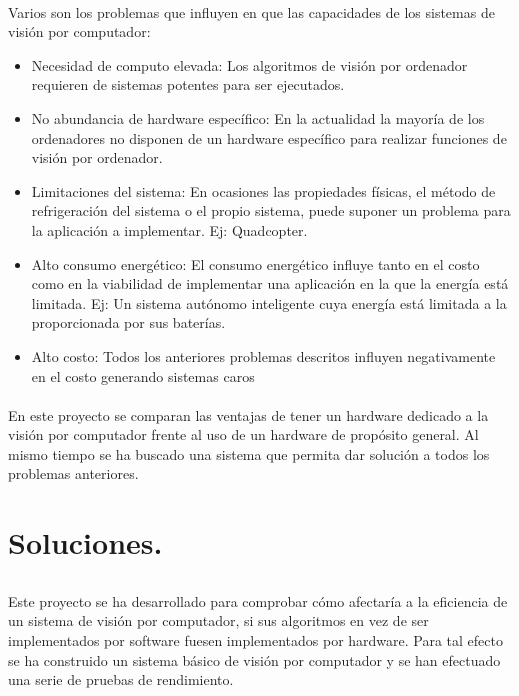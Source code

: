 \documentclass[a4paper,12pt,titlepage,final]{book}
\begin{document}
\paragraph{}
Varios son los problemas que influyen en que las capacidades de los sistemas de visión por computador:
\begin{itemize}
  \item Necesidad de computo elevada: Los algoritmos de visión por ordenador requieren de sistemas potentes para ser ejecutados.
  \item No abundancia de hardware específico: En la actualidad la mayoría de los ordenadores no disponen de un hardware específico para realizar funciones de visión por ordenador.
  \item Limitaciones del sistema: En ocasiones las propiedades físicas, el método de refrigeración del sistema o el propio sistema, puede suponer un problema para la aplicación a implementar. Ej: Quadcopter.
  \item Alto consumo energético: El consumo energético influye tanto en el costo como en la viabilidad de implementar una aplicación en la que la energía está limitada. Ej: Un sistema autónomo inteligente cuya energía está limitada a la proporcionada por sus baterías.
  \item Alto costo: Todos los anteriores problemas descritos influyen negativamente en el costo generando sistemas caros
\end{itemize}

\paragraph{}
En este proyecto se comparan las ventajas de tener un hardware dedicado a la
visión por computador frente al uso de un hardware de propósito general. Al
mismo tiempo se ha buscado una sistema que permita dar solución a todos los
problemas anteriores.

\section{Soluciones.}
\subsection*{}
\subsubsection*{}

\paragraph{}
Este proyecto se ha desarrollado para comprobar cómo afectaría a la eficiencia de un sistema de visión por computador, si sus algoritmos en vez de ser implementados por software fuesen implementados por hardware. Para tal efecto se ha construido un sistema básico de visión por computador y se han efectuado una serie de pruebas de rendimiento.
\end{document}
